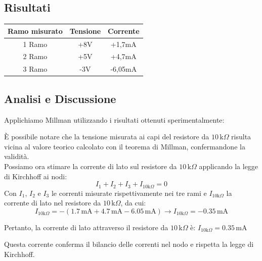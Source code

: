 \subsection{Risultati}
\begin{center}
        \begin{tabular}{c|c|c}
        Ramo misurato &  Tensione & Corrente\\
        \hline
         1 Ramo & +8V & +1,7mA \\
    \hline
         2 Ramo & +5V & +4,7mA \\
    \hline
         3 Ramo & -3V & -6,05mA
    \end{tabular}
\end{center}

\subsection{Analisi e Discussione}
Applichiamo Millman utilizzando i risultati ottenuti sperimentalmente:
\begin{center}
\end{center}
È possibile notare che la tensione misurata ai capi del resistore da $10 \, \text{k}\Omega$ risulta vicina al valore teorico calcolato con il teorema di Millman, confermandone la validità.\\
Possiamo ora stimare la corrente di lato sul resistore da \(10 \, \text{k}\Omega\) applicando la legge di Kirchhoff ai nodi: 
\[
I_1 + I_2 + I_3 + I_{10\text{k}\Omega} = 0
\]
Con \(I_1\), \(I_2\) e \(I_3\) le correnti misurate rispettivamente nei tre rami e \(I_{10\text{k}\Omega}\) la corrente di lato nel resistore da \(10 \, \text{k}\Omega\), da cui:
\[
I_{10\text{k}\Omega} = -(1.7 \, \text{mA} + 4.7 \, \text{mA} - 6.05 \, \text{mA}) \longrightarrow I_{10\text{k}\Omega} = -0.35 \, \text{mA}
\]



Pertanto, la corrente di lato attraverso il resistore da \(10 \, \text{k}\Omega\) è: $I_{10\text{k}\Omega} = 0.35 \, \text{mA}$


Questa corrente conferma il bilancio delle correnti nel nodo e rispetta la legge di Kirchhoff.

